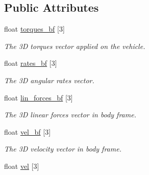 \subsection*{Public Attributes}
\begin{DoxyCompactItemize}
\item 
\hypertarget{structsimulation__model__t_a8b6e692eedf657b38db3da6ce8bf7447}{float \hyperlink{structsimulation__model__t_a8b6e692eedf657b38db3da6ce8bf7447}{torques\+\_\+bf} \mbox{[}3\mbox{]}}\label{structsimulation__model__t_a8b6e692eedf657b38db3da6ce8bf7447}

\begin{DoxyCompactList}\small\item\em The 3\+D torques vector applied on the vehicle. \end{DoxyCompactList}\item 
\hypertarget{structsimulation__model__t_aaea9417bdab246dcb084cb3eae639f69}{float \hyperlink{structsimulation__model__t_aaea9417bdab246dcb084cb3eae639f69}{rates\+\_\+bf} \mbox{[}3\mbox{]}}\label{structsimulation__model__t_aaea9417bdab246dcb084cb3eae639f69}

\begin{DoxyCompactList}\small\item\em The 3\+D angular rates vector. \end{DoxyCompactList}\item 
\hypertarget{structsimulation__model__t_adbc12d0de8065a69cb344040037ab9c0}{float \hyperlink{structsimulation__model__t_adbc12d0de8065a69cb344040037ab9c0}{lin\+\_\+forces\+\_\+bf} \mbox{[}3\mbox{]}}\label{structsimulation__model__t_adbc12d0de8065a69cb344040037ab9c0}

\begin{DoxyCompactList}\small\item\em The 3\+D linear forces vector in body frame. \end{DoxyCompactList}\item 
\hypertarget{structsimulation__model__t_a0bf44381bdf7c6be4d1b69c81ee4a777}{float \hyperlink{structsimulation__model__t_a0bf44381bdf7c6be4d1b69c81ee4a777}{vel\+\_\+bf} \mbox{[}3\mbox{]}}\label{structsimulation__model__t_a0bf44381bdf7c6be4d1b69c81ee4a777}

\begin{DoxyCompactList}\small\item\em The 3\+D velocity vector in body frame. \end{DoxyCompactList}\item 
\hypertarget{structsimulation__model__t_abae7110c6f2887494997a1e5ac6ae783}{float \hyperlink{structsimulation__model__t_abae7110c6f2887494997a1e5ac6ae783}{vel} \mbox{[}3\mbox{]}}\label{structsimulation__model__t_abae7110c6f2887494997a1e5ac6ae783}


\end{DoxyCompactItemize}

